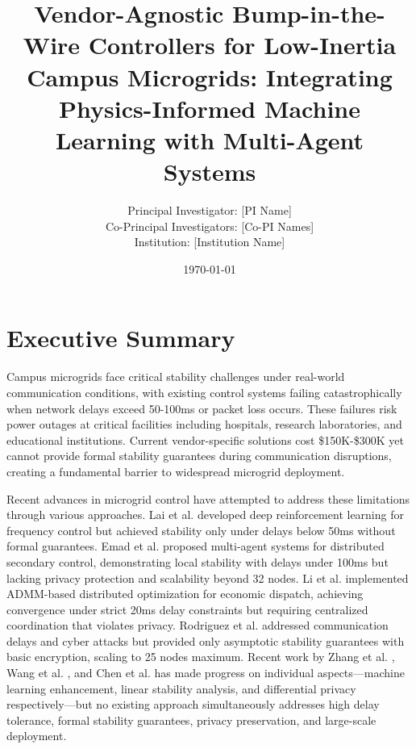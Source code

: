 \documentclass[12pt]{article}
\begin{document}
\title{\Large\textbf{Vendor-Agnostic Bump-in-the-Wire Controllers for Low-Inertia Campus Microgrids: Integrating Physics-Informed Machine Learning with Multi-Agent Systems}}


\author{Principal Investigator: [PI Name]\\
Co-Principal Investigators: [Co-PI Names]\\
Institution: [Institution Name]}

\date{\today}

\maketitle

\section{Executive Summary}

Campus microgrids face critical stability challenges under real-world communication conditions, with existing control systems failing catastrophically when network delays exceed 50-100ms or packet loss occurs. These failures risk power outages at critical facilities including hospitals, research laboratories, and educational institutions. Current vendor-specific solutions cost \$150K-\$300K yet cannot provide formal stability guarantees during communication disruptions, creating a fundamental barrier to widespread microgrid deployment.

Recent advances in microgrid control have attempted to address these limitations through various approaches. Lai et al. \cite{lai2023} developed deep reinforcement learning for frequency control but achieved stability only under delays below 50ms without formal guarantees. Emad et al. \cite{emad2024} proposed multi-agent systems for distributed secondary control, demonstrating local stability with delays under 100ms but lacking privacy protection and scalability beyond 32 nodes. Li et al. \cite{li2023} implemented ADMM-based distributed optimization for economic dispatch, achieving convergence under strict 20ms delay constraints but requiring centralized coordination that violates privacy. Rodriguez et al. \cite{rodriguez2022} addressed communication delays and cyber attacks but provided only asymptotic stability guarantees with basic encryption, scaling to 25 nodes maximum. Recent work by Zhang et al. \cite{zhang2024}, Wang et al. \cite{wang2025}, and Chen et al. \cite{chen2024} has made progress on individual aspects—machine learning enhancement, linear stability analysis, and differential privacy respectively—but no existing approach simultaneously addresses high delay tolerance, formal stability guarantees, privacy preservation, and large-scale deployment.
\end{document}
